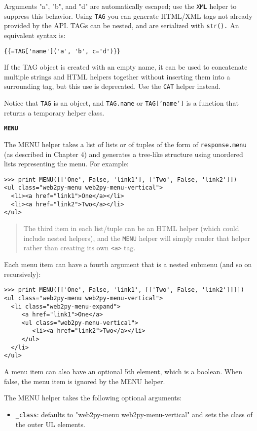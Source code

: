 \documentclass[justified,sixbynine,notoc]{tufte-book}
\def\ft{\small\tt}
\def\inxx#1{\index{#1}}
\begin{document}
\begin{fullwidth}
Arguments "a", "b", and "d" are automatically escaped; use the {\ft XML} helper to suppress this behavior. Using {\ft TAG} you can generate HTML/XML tags not already provided by the API. TAGs can be nested, and are serialized with {\ft str().}
An equivalent syntax is:
\begin{lstlisting}[keywords={}]
{{=TAG['name']('a', 'b', c='d')}}
\end{lstlisting}

If the TAG object is created with an empty name, it can be used to concatenate multiple strings and HTML helpers together without inserting them into a surrounding tag, but this use is deprecated. Use the {\ft CAT} helper instead.

Notice that {\ft TAG} is an object, and {\ft TAG.name} or {\ft TAG['name']} is a function that returns a temporary helper class.

{\bf {\ft MENU}}

\inxx{MENU}

The MENU helper takes a list of lists or of tuples of the form of {\ft response.menu} (as described in Chapter 4) and generates a tree-like structure using unordered lists representing the menu. For example:
\begin{lstlisting}
>>> print MENU([['One', False, 'link1'], ['Two', False, 'link2']])
<ul class="web2py-menu web2py-menu-vertical">
  <li><a href="link1">One</a></li>
  <li><a href="link2">Two</a></li>
</ul>
\end{lstlisting}

\begin{quote}The third item in each list/tuple can be an HTML helper (which could include nested helpers), and the {\ft MENU} helper will simply render that helper rather than creating its own {\ft <a>} tag.\end{quote}
Each menu item can have a fourth argument that is a nested submenu (and so on recursively):
\begin{lstlisting}
>>> print MENU([['One', False, 'link1', [['Two', False, 'link2']]]])
<ul class="web2py-menu web2py-menu-vertical">
  <li class="web2py-menu-expand">
     <a href="link1">One</a>
     <ul class="web2py-menu-vertical">
        <li><a href="link2">Two</a></li>
     </ul>
  </li>
</ul>
\end{lstlisting}

A menu item can also have an optional 5th element, which is a boolean. When false, the menu item is ignored by the MENU helper.

The MENU helper takes the following optional arguments:
\begin{itemize}
\item {\ft \_class}: defaults to "web2py-menu web2py-menu-vertical" and sets the class of the outer UL elements.


\end{itemize}
\end{fullwidth}
\end{document}
